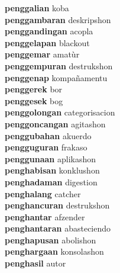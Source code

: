 \textbf{penggalian } koba \\
\textbf{penggambaran } deskripshon \\
\textbf{penggandingan } acopla \\
\textbf{penggelapan } blackout \\
\textbf{penggemar } amatùr \\
\textbf{penggempuran } destrukshon \\
\textbf{penggenap } kompañamentu \\
\textbf{penggerek } bor \\
\textbf{penggesek } bog \\
\textbf{penggolongan } categorisacion \\
\textbf{penggoncangan } agitashon \\
\textbf{penggubahan } akuerdo \\
\textbf{pengguguran } frakaso \\
\textbf{penggunaan } aplikashon \\
\textbf{penghabisan } konklushon \\
\textbf{penghadaman } digestion \\
\textbf{penghalang } catcher \\
\textbf{penghancuran } destrukshon \\
\textbf{penghantar } afzender \\
\textbf{penghantaran } abasteciendo \\
\textbf{penghapusan } abolishon \\
\textbf{penghargaan } konsolashon \\
\textbf{penghasil } autor \\

